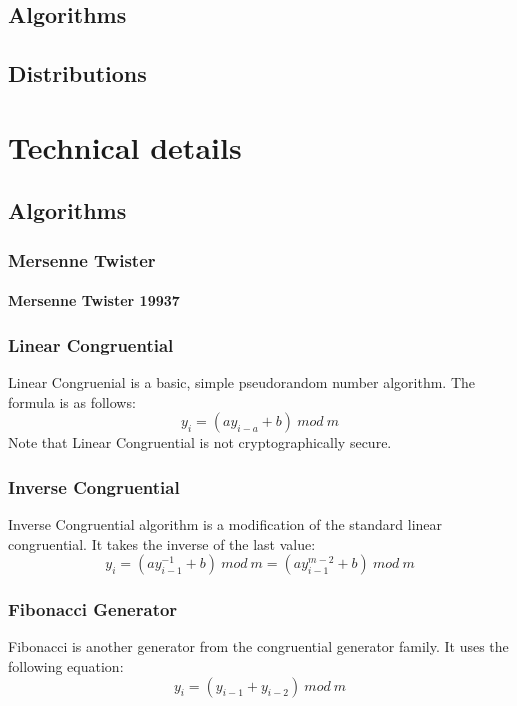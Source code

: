\documentclass{scrartcl}
\begin{document}
\subsection{Algorithms}
\subsection{Distributions}

\section{Technical details}
\subsection{Algorithms}
\subsubsection{Mersenne Twister}
\paragraph{Mersenne Twister 19937}
\subsubsection{Linear Congruential}
Linear Congruenial is a basic, simple pseudorandom number algorithm. The formula is as follows:
\begin{equation} y_i = (a{y}_{i-a}+b)\:mod\:m \end{equation}
Note that Linear Congruential is not cryptographically secure.
\subsubsection{Inverse Congruential}
Inverse Congruential algorithm is a modification of the standard linear congruential. It takes the inverse of the last value:
\begin{equation}y_i = (a{y}_{i-1}^{-1}+b)\:mod\:m = (a{y}_{i-1}^{m-2}+b)\:mod\:m \end{equation}
\subsubsection{Fibonacci Generator}
Fibonacci is another generator from the congruential generator family. It uses the following equation:
\begin{equation} y_i = (y_{i-1}+y_{i-2})\:mod\:m \end{equation}
\end{document}
